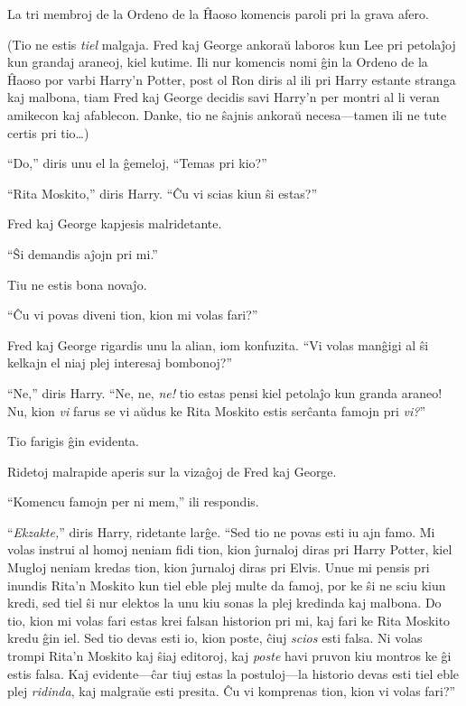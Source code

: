 La tri membroj de la Ordeno de la Ĥaoso komencis paroli pri la grava
afero.

(Tio ne estis \emph{tiel} malgaja. Fred kaj George ankoraŭ laboros kun
Lee pri petolaĵoj kun grandaj araneoj, kiel kutime. Ili nur komencis
nomi ĝin la Ordeno de la Ĥaoso por varbi Harry'n Potter, post ol Ron
diris al ili pri Harry estante stranga kaj malbona, tiam Fred kaj
George decidis savi Harry'n per montri al li veran amikecon kaj
afablecon. Danke, tio ne ŝajnis ankoraŭ necesa—tamen ili ne tute
certis pri tio\ldots{})

``Do,'' diris unu el la ĝemeloj, ``Temas pri kio?''

``Rita Moskito,'' diris Harry. ``Ĉu vi scias kiun ŝi estas?''

Fred kaj George kapjesis malridetante.

``Ŝi demandis aĵojn pri mi.''

Tiu ne estis bona novaĵo.

``Ĉu vi povas diveni tion, kion mi volas fari?''

Fred kaj George rigardis unu la alian, iom konfuzita. ``Vi volas
manĝigi al ŝi kelkajn el niaj plej interesaj bombonoj?''

``Ne,'' diris Harry. ``Ne, ne, \emph{ne!} tio estas pensi kiel
petolaĵo kun granda araneo! Nu, kion \emph{vi} farus se vi aŭdus ke
Rita Moskito estis serĉanta famojn pri \emph{vi?}''

Tio farigis ĝin evidenta.

Ridetoj malrapide aperis sur la vizaĝoj de Fred kaj George.

``Komencu famojn per ni mem,'' ili respondis.

``\emph{Ekzakte,}'' diris Harry, ridetante larĝe. ``Sed tio ne povas
esti iu ajn famo. Mi volas instrui al homoj neniam fidi tion, kion
ĵurnaloj diras pri Harry Potter, kiel Mugloj neniam kredas tion, kion
ĵurnaloj diras pri Elvis. Unue mi pensis pri inundis Rita'n Moskito
kun tiel eble plej multe da famoj, por ke ŝi ne sciu kiun kredi, sed
tiel ŝi nur elektos la unu kiu sonas la plej kredinda kaj malbona. Do
tio, kion mi volas fari estas krei falsan historion pri mi, kaj fari
ke Rita Moskito kredu ĝin iel. Sed tio devas esti io, kion poste, ĉiuj
\emph{scios} esti falsa. Ni volas trompi Rita'n Moskito kaj ŝiaj
editoroj, kaj \emph{poste} havi pruvon kiu montros ke ĝi estis
falsa. Kaj evidente—ĉar tiuj estas la postuloj—la historio devas esti
tiel eble plej \emph{ridinda}, kaj malgraŭe esti presita. Ĉu vi
komprenas tion, kion vi volas fari?''


